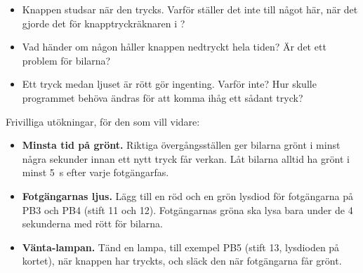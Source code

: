 \begin{itemize}
  \item Knappen studsar när den trycks. Varför ställer det inte till något här, när det gjorde det
    för knapptryckräknaren i ?
  \item Vad händer om någon håller knappen nedtryckt hela tiden? Är det ett problem för bilarna?
  \item Ett tryck medan ljuset är rött gör ingenting. Varför inte? Hur skulle programmet behöva
    ändras för att komma ihåg ett sådant tryck?
\end{itemize}

Frivilliga utökningar, för den som vill vidare:
\begin{itemize}
  \item \textbf{Minsta tid på grönt.} Riktiga övergångsställen ger bilarna grönt i minst några
    sekunder innan ett nytt tryck får verkan. Låt bilarna alltid ha grönt i minst 5~s efter varje
    fotgängarfas.
  \item \textbf{Fotgängarnas ljus.} Lägg till en röd och en grön lysdiod för fotgängarna på PB3 och
    PB4 (stift 11 och 12). Fotgängarnas gröna ska lysa bara under de 4 sekunderna med rött för
    bilarna.
  \item \textbf{Vänta-lampan.} Tänd en lampa, till exempel PB5 (stift 13, lysdioden på kortet), när
    knappen har tryckts, och släck den när fotgängarna får grönt.
\end{itemize}

